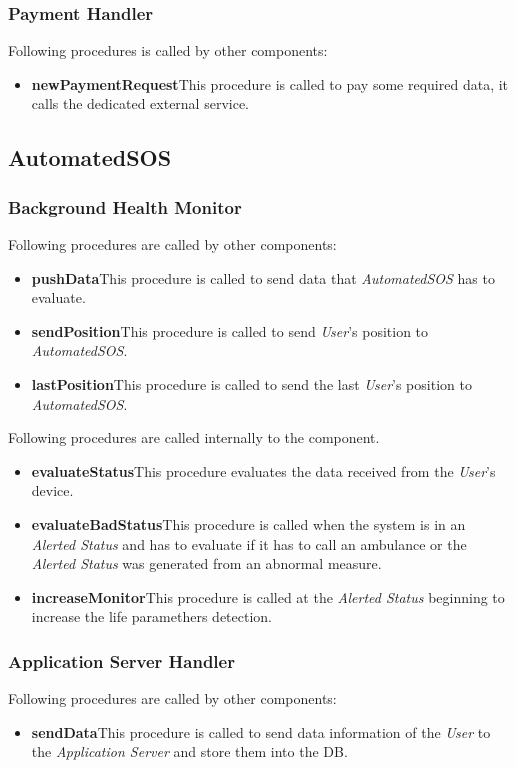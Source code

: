 \subsubsection{Payment Handler}
Following procedures is called by other components:
\begin{itemize}
  \item \textbf{newPaymentRequest}\quad This procedure is called to pay some required data, it calls the dedicated external service.
\end{itemize}

\subsection{AutomatedSOS}
\subsubsection{Background Health Monitor}
Following procedures are called by other components:
\begin{itemize}
  \item \textbf{pushData}\quad This procedure is called to send data that \textit{AutomatedSOS} has to evaluate.
  \item \textbf{sendPosition}\quad This procedure is called to send \textit{User}'s position to \textit{AutomatedSOS}.
  \item \textbf{lastPosition}\quad This procedure is called to send the last \textit{User}'s position to \textit{AutomatedSOS}.
\end{itemize}

\myparagraph{}
Following procedures are called internally to the component.
\begin{itemize}
  \item \textbf{evaluateStatus}\quad This procedure evaluates the data received from the \textit{User}'s device.
  \item \textbf{evaluateBadStatus}\quad This procedure is called when the system is in an \textit{Alerted Status} and has to evaluate if it has to call an ambulance or the \textit{Alerted Status} was generated from an abnormal measure.
  \item \textbf{increaseMonitor}\quad This procedure is called at the \textit{Alerted Status} beginning to increase the life paramethers detection.
\end{itemize}

\subsubsection{Application Server Handler}
Following procedures are called by other components:
\begin{itemize}
  \item \textbf{sendData}\quad This procedure is called to send data information of the \textit{User} to the \textit{Application Server} and store them into the DB.
\end{itemize}

